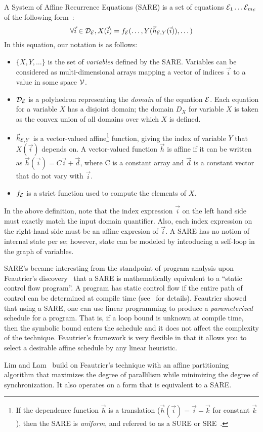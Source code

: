 A System of Affine Recurrence Equations (SARE) is a set of equations
${\cal E}_1 \dots {\cal E}_{m_{\cal E}}$ of the following form~\cite{DRV00,Feautrier92i}:
\begin{equation}
\forall {\vec i} \in {\cal D_{\cal E}}, X({\vec i}) = f_{\cal E}(\dots, Y({\vec h}_{{\cal
E}, Y}({\vec i})), \dots)
\label{eq:sare}
\end{equation}
In this equation, our notation is as follows:
\begin{itemize}

\item $\{X, Y, \dots\}$ is the set of {\it variables} defined by the
SARE.  Variables can be considered as multi-dimensional arrays mapping
a vector of indices ${\vec i}$ to a value in some space ${\cal V}$.

\item ${\cal D_{\cal E}}$ is a polyhedron representing the {\it
domain} of the equation ${\cal E}$.  Each equation for a variable $X$
has a disjoint domain; the domain $D_X$ for variable $X$ is taken as
the convex union of all domains over which $X$ is defined.

\item ${\vec h}_{{\cal E}, Y}$ is a vector-valued affine\footnote{If
the dependence function ${\vec h}$ is a translation (${\vec h}({\vec
i}) = {\vec i} - {\vec k}$ for constant ${\vec k}$), then the SARE is
{\it uniform}, and referred to as a SURE or SRE~\cite{karp67}.}
function, giving the index of variable $Y$ that $X({\vec i})$ depends
on.  A vector-valued function ${\vec h}$ is affine if it can be
written as ${\vec h}({\vec i}) = C{\vec i} + {\vec d}$, where C is a
constant array and ${\vec d}$ is a constant vector that do not vary
with ${\vec i}$.

\item $f_{\cal E}$ is a strict function used to compute the elements
of $X$.

\end{itemize}

In the above definition, note that the index expression ${\vec i}$ on
the left hand side must exactly match the input domain quantifier.
Also, each index expression on the right-hand side must be an affine
expresion of ${\vec i}$.  A SARE has no notion of internal state per
se; however, state can be modeled by introducing a self-loop in the
graph of variables.

SARE's became interesting from the standpoint of program analysis upon
Feautrier's discovery~\cite{Feautrier92i,Feautrier92ii} that a SARE is
mathematically equivalent to a ``static control flow program''.  A
program has static control flow if the entire path of control can be
determined at compile time (see~\cite{Feautrier92i,FV00} for details).
Feautrier showed that using a SARE, one can use linear programming to
produce a {\it parameterized} schedule for a program.  That is, if a
loop bound is unknown at compile time, then the symbolic bound enters
the schedule and it does not affect the complexity of the technique.
Feautrier's framework is very flexible in that it allows you to select
a desirable affine schedule by any linear heuristic.

Lim and Lam~\cite{Lim01} build on Feautrier's technique with an affine
partitioning algorithm that maximizes the degree of parallilism while
minimizing the degree of synchronization.  It also operates on a form
that is equivalent to a SARE.
